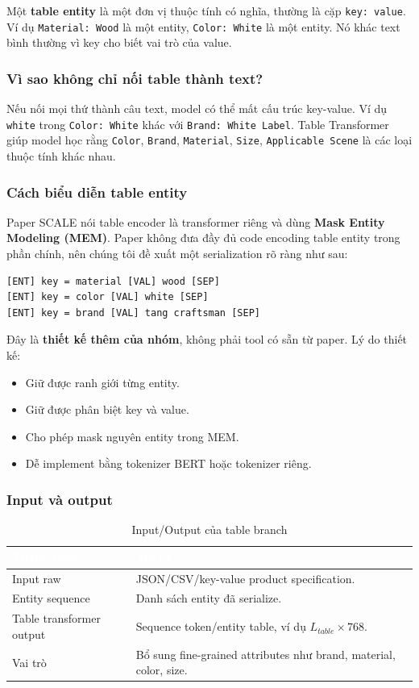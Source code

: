 \documentclass[12pt,a4paper]{article}
\begin{document}
Một \textbf{table entity} là một đơn vị thuộc tính có nghĩa, thường là cặp \texttt{key: value}. Ví dụ \texttt{Material: Wood} là một entity, \texttt{Color: White} là một entity. Nó khác text bình thường vì key cho biết vai trò của value.

\subsubsection{Vì sao không chỉ nối table thành text?}
Nếu nối mọi thứ thành câu text, model có thể mất cấu trúc key-value. Ví dụ \texttt{white} trong \texttt{Color: White} khác với \texttt{Brand: White Label}. Table Transformer giúp model học rằng \texttt{Color}, \texttt{Brand}, \texttt{Material}, \texttt{Size}, \texttt{Applicable Scene} là các loại thuộc tính khác nhau.

\subsubsection{Cách biểu diễn table entity}
Paper SCALE nói table encoder là transformer riêng và dùng \textbf{Mask Entity Modeling (MEM)}. Paper không đưa đầy đủ code encoding table entity trong phần chính, nên chúng tôi đề xuất một serialization rõ ràng như sau:

\begin{lstlisting}
[ENT] key = material [VAL] wood [SEP]
[ENT] key = color [VAL] white [SEP]
[ENT] key = brand [VAL] tang craftsman [SEP]
\end{lstlisting}

Đây là \textbf{thiết kế thêm của nhóm}, không phải tool có sẵn từ paper. Lý do thiết kế:
\begin{itemize}
  \item Giữ được ranh giới từng entity.
  \item Giữ được phân biệt key và value.
  \item Cho phép mask nguyên entity trong MEM.
  \item Dễ implement bằng tokenizer BERT hoặc tokenizer riêng.
\end{itemize}

\subsubsection{Input và output}
\begin{table}[htbp]
\centering
\begin{tabularx}{\linewidth}{@{}L{3.6cm}Y@{}}
\toprule
{}
\textcolor{white}{\textbf{Thành phần}} & \textcolor{white}{\textbf{Mô tả}} \\
\midrule
Input raw & JSON/CSV/key-value product specification. \\
Entity sequence & Danh sách entity đã serialize. \\
Table transformer output & Sequence token/entity table, ví dụ $L_{table} \times 768$. \\
Vai trò & Bổ sung fine-grained attributes như brand, material, color, size. \\
\bottomrule
\end{tabularx}
\caption{Input/Output của table branch}
\end{table}
\end{document}
